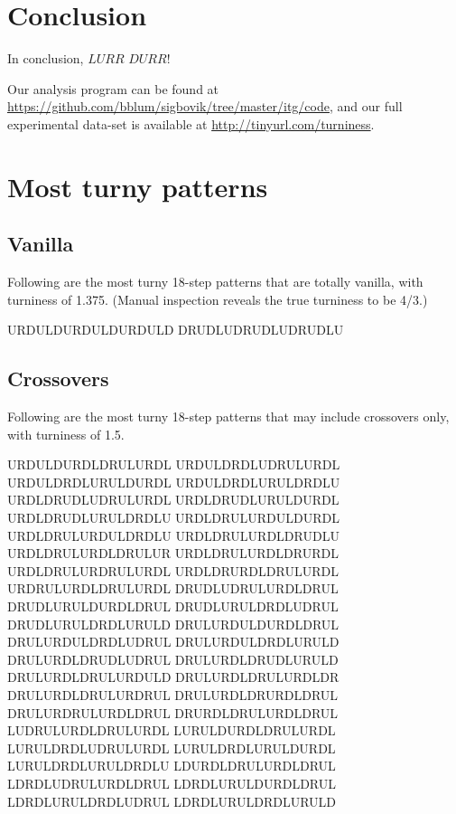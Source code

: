 \documentclass[10pt]{sigplanconf}
\begin{document}
\section{Conclusion}

In conclusion, $LURR$ $DURR$!

Our analysis program can be found at \url{https://github.com/bblum/sigbovik/tree/master/itg/code}, and our full experimental data-set is available at \url{http://tinyurl.com/turniness}.


\appendix

\section{Most turny patterns}


\subsection{Vanilla}

Following are the most turny 18-step patterns that are totally vanilla, with turniness of 1.375. (Manual inspection reveals the true turniness to be 4/3.)

\noindent
URDULDURDULDURDULD
DRUDLUDRUDLUDRUDLU

\subsection{Crossovers}

Following are the most turny 18-step patterns that may include crossovers only, with turniness of 1.5.

\noindent
URDULDURDLDRULURDL
URDULDRDLUDRULURDL
URDULDRDLURULDURDL
URDULDRDLURULDRDLU
URDLDRUDLUDRULURDL
URDLDRUDLURULDURDL
URDLDRUDLURULDRDLU
URDLDRULURDULDURDL
URDLDRULURDULDRDLU
URDLDRULURDLDRUDLU
URDLDRULURDLDRULUR
URDLDRULURDLDRURDL
URDLDRULURDRULURDL
URDLDRURDLDRULURDL
URDRULURDLDRULURDL
DRUDLUDRULURDLDRUL
DRUDLURULDURDLDRUL
DRUDLURULDRDLUDRUL
DRUDLURULDRDLURULD
DRULURDULDURDLDRUL
DRULURDULDRDLUDRUL
DRULURDULDRDLURULD
DRULURDLDRUDLUDRUL
DRULURDLDRUDLURULD
DRULURDLDRULURDULD
DRULURDLDRULURDLDR
DRULURDLDRULURDRUL
DRULURDLDRURDLDRUL
DRULURDRULURDLDRUL
DRURDLDRULURDLDRUL
LUDRULURDLDRULURDL
LURULDURDLDRULURDL
LURULDRDLUDRULURDL
LURULDRDLURULDURDL
LURULDRDLURULDRDLU
LDURDLDRULURDLDRUL
LDRDLUDRULURDLDRUL
LDRDLURULDURDLDRUL
LDRDLURULDRDLUDRUL
LDRDLURULDRDLURULD
\end{document}
